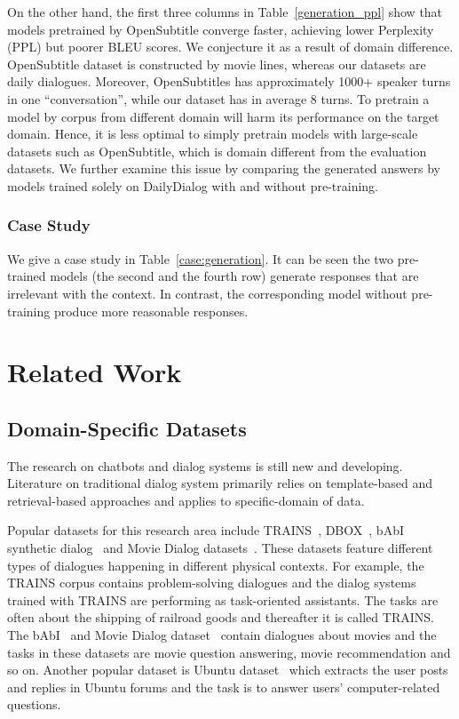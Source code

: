 \documentclass[11pt,letterpaper]{article}
\begin{document}
On the other hand, the first three columns in Table~\ref{generation_ppl} show that models pretrained by OpenSubtitle converge faster, achieving lower Perplexity (PPL) but poorer BLEU scores. We conjecture it as a result of domain difference. OpenSubtitle dataset is constructed by movie lines, whereas our datasets are daily dialogues. Moreover, OpenSubtitles has approximately 1000+ speaker turns in one “conversation”, while our dataset has in average 8 turns. To pretrain a model by corpus from different domain will harm its performance on the target domain. Hence, it is less optimal to simply pretrain models with large-scale datasets such as OpenSubtitle, which is domain different from the evaluation datasets. We further examine this issue by comparing the generated answers by models trained solely on DailyDialog with and without pre-training. %

\subsubsection{Case Study}
We give a case study in Table~\ref{case:generation}. It can be seen the two pre-trained models (the second and the fourth row) generate responses that are irrelevant with the context. In contrast, the corresponding model without pre-training produce more reasonable responses.

\section{Related Work}
\subsection{Domain-Specific Datasets}
The research on chatbots and dialog systems is still new and developing. Literature on traditional dialog system primarily relies on template-based and retrieval-based approaches and applies to specific-domain of data. 

Popular datasets for this research area include TRAINS~\cite{trains}, DBOX~\cite{dbox}, bAbI synthetic dialog~\cite{babi} and Movie Dialog datasets~\cite{moviedialog}. These datasets feature different types of dialogues happening in different physical contexts. For example, the TRAINS corpus contains problem-solving dialogues and the dialog systems trained with TRAINS are performing as task-oriented assistants. The tasks are often about the shipping of railroad goods and thereafter it is called TRAINS. The bAbI~\cite{babi} and Movie Dialog dataset~\cite{moviedialog} contain dialogues about movies and the tasks in these datasets are movie question answering, movie recommendation and so on. Another popular dataset is Ubuntu dataset~\cite{ubuntu} which extracts the user posts and replies in Ubuntu forums and the task is to answer users' computer-related questions.
\end{document}
